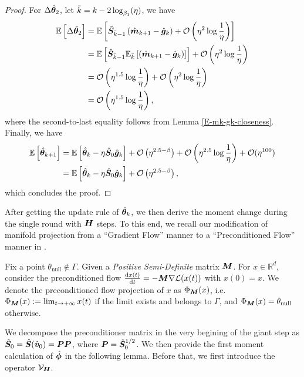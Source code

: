 \begin{proof}
For $\Delta \hat{{\bm{\theta}}}_2$, let $\Bar{k} = k - 2\log_{\beta_1}(\eta)$, we have \begin{align*}
    \mathbb{E}\left[\Delta \hat{{\bm{\theta}}}_2\right] &= \mathbb{E}\left[\hat{{\bm{S}}}_{\Bar{k}-1}\left(\hat{{\bm{m}}}_{k+1}-\hat{{\bm{g}}}_k\right) + \mathcal{O}\left(\eta^2 \log \frac{1}{\eta}\right)\right] \\
    &= \mathbb{E}\left[\hat{{\bm{S}}}_{\Bar{k}-1}\mathbb{E}_{\Bar{k}}\left[\left(\hat{{\bm{m}}}_{k+1}-\hat{{\bm{g}}}_k\right)\right] \right] + \mathcal{O}\left(\eta^2 \log \frac{1}{\eta}\right) \\
    &= \mathcal{O}\left(\eta^{1.5} \log \frac{1}{\eta}\right) + \mathcal{O}\left(\eta^2 \log \frac{1}{\eta}\right) \\
    &= \mathcal{O}\left(\eta^{1.5} \log \frac{1}{\eta}\right),
\end{align*}
where the second-to-last equality follows from Lemma \ref{E-mk-gk-closeness}. Finally, we have \begin{align*}
    \mathbb{E}\left[\hat{{\bm{\theta}}}_{k+1}\right] &= \mathbb{E}\left[\hat{{\bm{\theta}}}_k - \eta\hat{{\bm{S}}}_0 \hat{{\bm{g}}}_k\right] + \mathcal{O}\left(\eta^{2.5-\beta}\right) + \mathcal{O}\left(\eta^{2.5} \log \frac{1}{\eta}\right) +\mathcal{O}(\eta^{100}) \\
    &= \mathbb{E}\left[\hat{{\bm{\theta}}}_k - \eta\hat{{\bm{S}}}_0 \hat{{\bm{g}}}_k\right] + \mathcal{O}\left(\eta^{2.5-\beta}\right) ,
\end{align*}
which concludes the proof.
\end{proof}
After getting the update rule of $\hat{{\bm{\theta}}}_k$, we then derive the moment change during the single round with ${\bm{H}}$ steps. To this end, we recall our modification of manifold projection from a ``Gradient Flow'' manner to a ``Preconditioned Flow'' manner in . 
\begin{definition}
    Fix a point \( \theta_{\text{null}} \notin \Gamma \). Given a \textit{Positive Semi-Definite} matrix ${\bm{M}}$. For \( x \in \mathbb{R}^d \), consider the preconditioned flow $\frac{\mathrm{d} x(t)}{\mathrm{d} t} = -{\bm{M}}\nabla \mathcal{L}(x(t))$ with $x(0) = x$. We denote the preconditioned flow projection of \( x \) as \( \Phi_{{\bm{M}}}(x) \), i.e. $\Phi_{{\bm{M}}}(x) := \lim_{t \to +\infty} x(t)$ if the limit exists and belongs to $\Gamma$, and $\Phi_{{\bm{M}}}(x) = \theta_{\text{null}}$ otherwise.
\end{definition}
We decompose the preconditioner matrix in the very begining of the giant step as $\hat{{\bm{S}}}_0=\hat{{\bm{S}}}(\hat{{\bm{v}}}_0)={\bm{P}}{\bm{P}}$, where ${\bm{P}}=\hat{{\bm{S}}}^{1/2}_0$. We then provide the first moment calculation of $\hat{{\bm{\phi}}}$ in the following lemma. Before that, we first introduce the operator $\mathcal{V}_{\bm{H}}$.

